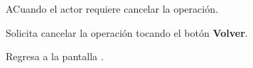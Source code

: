 \begin{UCtrayectoriaA}{A}{Cuando el actor requiere cancelar la operación.}
	
	\UCpaso [\UCactor] Solicita cancelar la operación tocando el botón \textbf{Volver}.
	
	\UCpaso Regresa a la pantalla .
	
\end{UCtrayectoriaA}


